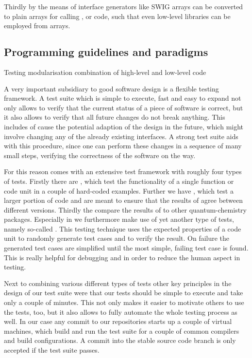 Thirdly by the means of interface generators
like SWIG  \numpy arrays can be converted to plain
\cee arrays for calling \cpp, \cee or \fortran code,
such that even low-level libraries can be employed
from \numpy arrays.



\subsection{Programming guidelines and paradigms}



Testing
modularisation
combination of high-level and low-level code

A very important subsidiary to good software design is a flexible testing framework.
A test suite which is simple to execute, fast and easy to expand not only allows to verify
that the current status of a piece of software is correct,
but it also allows to verify that all future changes do not break anything.
This includes of cause the potential adaption of the design in the future,
which might involve changing any of the already existing interfaces.
A strong test suite aids with this procedure,
since one can perform these changes in a sequence of many small steps,
verifying the correctness of the software on the way.

For this reason \molsturm comes with an extensive test framework
with roughly four types of tests.
Firstly there are ,
which test the functionality of a single function or code unit in a couple of hard-coded examples.
Further we have ,
which test a larger portion of code and are meant to ensure that
the results of \molsturm agree between different versions.
Thirdly the  compare
the results of \molsturm to other quantum-chemistry packages.
Especially in \lazyten we furthermore make use of yet another type of tests,
namely so-called .
This testing technique uses the expected properties of a code unit
to randomly generate test cases and to verify the result.
On failure the generated test cases are simplified until the most simple,
failing test case is found.
This is really helpful for debugging and in order to reduce the human aspect in testing.

Next to combining various different types of tests
other key principles in the design of our test suite were that our tests should be simple
to execute and take only a couple of minutes.
This not only makes it easier to motivate others to use the tests, too,
but it also allows to fully automate the whole testing process as well.
In our case any commit to our repositories starts up a couple of virtual machines,
which build \molsturm and run the test suite for a couple of common compilers and
build configurations.
A commit into the stable source code branch is only accepted if the test suite passes.

